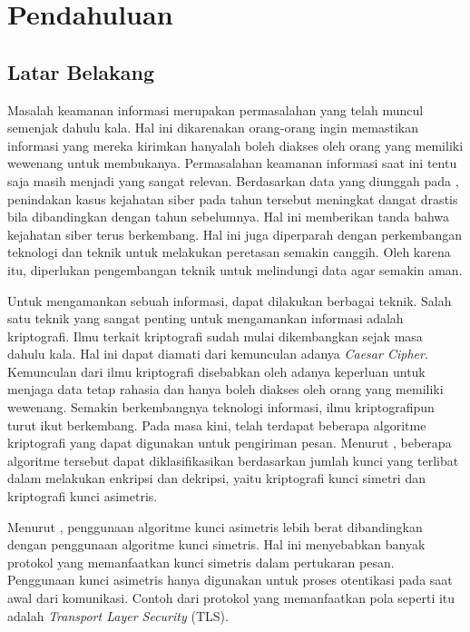 \chapter{Pendahuluan}

\section{Latar Belakang}
Masalah keamanan informasi merupakan permasalahan yang telah muncul semenjak dahulu kala. Hal ini dikarenakan orang-orang ingin memastikan informasi yang mereka kirimkan hanyalah boleh diakses oleh orang yang memiliki wewenang untuk membukanya. Permasalahan keamanan informasi saat ini tentu saja masih menjadi yang sangat relevan. Berdasarkan data yang diunggah pada \textcite{pusiknaspolri_cybercrime_2022}, penindakan kasus kejahatan siber pada tahun tersebut meningkat dangat drastis bila dibandingkan dengan tahun sebelumnya. Hal ini memberikan tanda bahwa kejahatan siber terus berkembang. Hal ini juga diperparah dengan perkembangan teknologi dan teknik untuk melakukan peretasan semakin canggih. Oleh karena itu, diperlukan pengembangan teknik untuk melindungi data agar semakin aman.

Untuk mengamankan sebuah informasi, dapat dilakukan berbagai teknik. Salah satu teknik yang sangat penting untuk mengamankan informasi adalah kriptografi. Ilmu terkait kriptografi sudah mulai dikembangkan sejak masa dahulu kala. Hal ini dapat diamati dari kemunculan adanya \emph{Caesar Cipher}. Kemunculan dari ilmu kriptografi disebabkan oleh adanya keperluan untuk menjaga data tetap rahasia dan hanya boleh diakses oleh orang yang memiliki wewenang. Semakin berkembangnya teknologi informasi, ilmu kriptografipun turut ikut berkembang. Pada masa kini, telah terdapat beberapa  algoritme kriptografi yang dapat digunakan untuk pengiriman pesan. Menurut \textcite{munir2019}, beberapa algoritme tersebut dapat diklasifikasikan berdasarkan jumlah kunci yang terlibat dalam melakukan enkripsi dan dekripsi, yaitu kriptografi kunci simetri dan kriptografi kunci asimetris.

Menurut \textcite{halak2022}, penggunaan algoritme kunci asimetris lebih berat dibandingkan dengan penggunaan algoritme kunci simetris. Hal ini menyebabkan banyak protokol yang memanfaatkan kunci simetris dalam pertukaran pesan. Penggunaan kunci asimetris hanya digunakan untuk proses otentikasi pada saat awal dari komunikasi. Contoh dari protokol yang memanfaatkan pola seperti itu adalah \emph{Transport Layer Security} (TLS).

